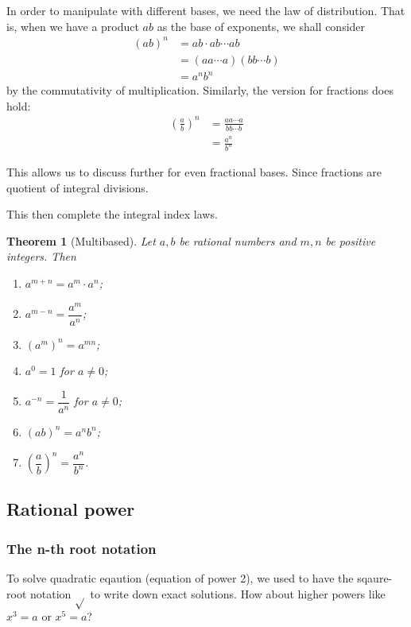 \documentclass[12pt]{article}
\newtheorem*{theorem}{Theorem}
\begin{document}
    In order to manipulate with different bases, we need the law of distribution. That is, when we have a product $ab$ as the base of exponents, we shall consider \begin{align*}
        (ab)^n&=ab\cdot ab\cdots ab\\
        &=(aa\cdots a)(bb\cdots b)\\
        &=a^n b^n
    \end{align*}
    by the commutativity of multiplication. Similarly, the version for fractions does hold:\begin{align*}
        (\frac{a}{b})^n&=\frac{aa\cdots a}{bb\cdots b}\\
        &=\frac{a^n}{b^n}
    \end{align*}

    This allows us to discuss further for even fractional bases. Since fractions are quotient of integral divisions.

    This then complete the integral index laws.

    \begin{theorem}[Multibased]
        Let $a, b$ be rational numbers and $m, n$ be positive integers. Then\begin{enumerate}
            \item $a^{m+n}=a^m\cdot a^n$;
            \item $a^{m-n}=\dfrac{a^m}{a^n}$;
            \item $(a^m)^n=a^{mn}$;
            \item $a^0=1$ for $a\neq 0$;
            \item $a^{-n}=\dfrac{1}{a^n}$ for $a\neq 0$;
            \item $(ab)^n=a^n b^n$;
            \item $(\dfrac{a}{b})^n=\dfrac{a^n}{b^n}$.
        \end{enumerate}
    \end{theorem}

    \subsection{Rational power}

    \subsubsection*{The n-th root notation}

    To solve quadratic eqaution (equation of power 2), we used to have the sqaure-root notation $\sqrt{}$ to write down exact solutions. How about higher powers like $x^3=a$ or $x^5=a$?
\end{document}
